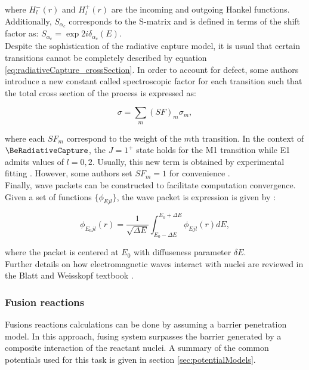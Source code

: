 \documentclass[openany]{book}
\begin{document}
where $H^{-}_l(r)$ and $H^{+}_l(r)$ are the incoming and outgoing Hankel functions. Additionally, $S_{\alpha_c}$ corresponds to the S-matrix and is defined in terms of the shift factor as: $S_{\alpha_c} = \exp{2i\delta_{\alpha_c	}}(E)$. \\

Despite the sophistication of the radiative capture model, it is usual that certain transitions cannot be completely described by equation \ref{eq:radiativeCapture_crossSection}. In order to account for defect, some authors introduce a new constant called spectroscopic factor for each transition such that the total cross section of the process is expressed as: 

\begin{equation}  \label{eq:radiativeCapture_crossSection_SF}
	\sigma = \sum_{m}{{(SF)}_m\sigma_m},		
\end{equation}

where each ${SF}_m$ correspond to the weight of the $m$th transition. In the context of $\BeRadiativeCapture$, the $J = 1^+$ state holds for the M1 transition while E1 admits values of $l=0, 2$. Usually, this new term is obtained by experimental fitting \cite{kabir_nabi_2021, xu_takahashi_goriely_arnould_ohta_utsunomiya_2013}. However, some authors set ${SF}_m = 1$ for convenience \cite{bertulani_1996}. \\

Finally, wave packets can be constructed to facilitate computation convergence. Given a set of functions $\{\phi_{Ejl}\}$, the wave packet is expression is given by \cite{bertulani_1996}:

\begin{equation}\label{eq:potential_wavePacket}
	\phi_{E_0jl}(r) = \frac{1}{\sqrt{\Delta E}} \int_{E_0 - \Delta E}^{E_0 + \Delta E} {\phi_{Ejl}(r)dE},
\end{equation}

where the packet is centered at $E_0$ with diffuseness parameter $\delta E$. \\

Further details on how electromagnetic waves interact with nuclei are reviewed in the Blatt and Weisskopf textbook \cite{blatt_weisskopf_1952}. 

\subsubsection{Fusion reactions} \label{ssub:potential_calculations_fusion}

Fusions reactions calculations can be done by assuming a barrier penetration model. In this approach, fusing system surpasses the barrier generated by a composite interaction of the reactant nuclei. A summary of the common potentials used for this task is given in section \ref{sec:potentialModels}. \\
\end{document}
